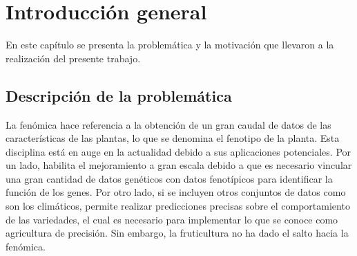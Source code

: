 
\chapter{Introducción general} %

\label{Chapter1} %
\label{IntroGeneral}


\newcommand{\keyword}[1]{\textbf{#1}}
\newcommand{\tabhead}[1]{\textbf{#1}}
\newcommand{\code}[1]{\texttt{#1}}
\newcommand{\file}[1]{\texttt{\bfseries#1}}
\newcommand{\option}[1]{\texttt{\itshape#1}}
\newcommand{\grados}{$^{\circ}$}




En este capítulo se presenta la problemática y la motivación que llevaron a la realización del presente trabajo.

\section{Descripción de la problemática}

La fenómica hace referencia a la obtención de un gran caudal de datos de las características de las plantas, lo que se denomina el fenotipo de la planta. Esta disciplina está en auge en la actualidad debido a sus aplicaciones potenciales. Por un lado, habilita el mejoramiento a gran escala debido a que es necesario vincular una gran cantidad de datos genéticos con datos fenotípicos para identificar la función de los genes. Por otro lado, si se incluyen otros conjuntos de datos como son los climáticos, permite realizar predicciones precisas sobre el comportamiento de las variedades, el cual es necesario para implementar lo que se conoce como agricultura de precisión. Sin embargo, la fruticultura no ha dado el salto hacia la fenómica.

